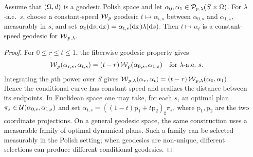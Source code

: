 \begin{prop}\label{prop-conditional-wasserstein-geodesics}
	Assume that $(\Omega,d)$ is a geodesic Polish space and let $\alpha_0,\alpha_1\in\mathcal{P}_{p,\lambda}(S\times\Omega)$. For $\lambda$-a.e.\ $s$, choose a constant-speed $\operatorname{\mathcal{W}}_p$ geodesic $t\mapsto\alpha_{t,s}$ between $\alpha_{0,s}$ and $\alpha_{1,s}$, measurably in $s$, and set
	$\alpha_t(\mathrm{d} s,\mathrm{d} x)=\alpha_{t,s}(\mathrm{d} x)\lambda(\mathrm{d} s)$.
	Then $t\mapsto\alpha_t$ is a constant-speed geodesic for $\operatorname{\mathcal{W}}_{p,\lambda}$.
\end{prop}
\begin{proof}
	For $0\leq r\leq t\leq1$, the fiberwise geodesic property gives
	\[
		\operatorname{\mathcal{W}}_p(\alpha_{r,s},\alpha_{t,s})
		=
		(t-r)\operatorname{\mathcal{W}}_p(\alpha_{0,s},\alpha_{1,s})
		\quad\text{for }\lambda\text{-a.e.\ }s.
	\]
	Integrating the $p$th power over $S$ gives
	$\operatorname{\mathcal{W}}_{p,\lambda}(\alpha_r,\alpha_t) = (t-r)\operatorname{\mathcal{W}}_{p,\lambda}(\alpha_0,\alpha_1)$.
	Hence the conditional curve has constant speed and realizes the distance between its endpoints. In Euclidean space one may take, for each $s$, an optimal plan $\pi_s\in\mathcal{U}(\alpha_{0,s},\alpha_{1,s})$ and set $\alpha_{t,s}=((1-t)\mathrm p_1+t\mathrm p_2)_\sharp\pi_s$, where $\mathrm p_1,\mathrm p_2$ are the two coordinate projections. On a general geodesic space, the same construction uses a measurable family of optimal dynamical plans. Such a family can be selected measurably in the Polish setting; when geodesics are non-unique, different selections can produce different conditional geodesics.
\end{proof}


